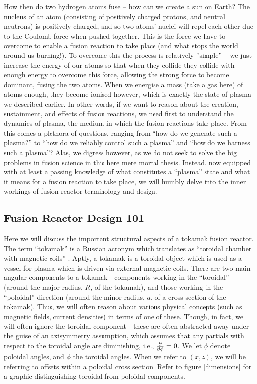 How then do two hydrogen atoms fuse -- how can we create a sun on Earth? The nucleus of an atom (consisting of positively charged 
protons, and neutral neutrons) is positively charged, and so two atoms' nuclei will repel each other due to the Coulomb force when pushed together. This is the force 
we have to overcome to enable a fusion reaction to take place (and what stops the world around us burning!). To overcome this the process is relatively ``simple'' -- 
we just increase the energy of our atoms so that when they collide they collide with enough energy to overcome this force, allowing the strong force to become
dominant, fusing the two atoms. When we energise a mass (take a gas here) of atoms enough, they become ionised however, which is 
exactly the state of plasma we described earlier. In other words, if we want to reason about the creation, sustainment, and effects of 
fusion reactions, we need first to understand the dynamics of plasma, the medium in which the fusion reactions take place. From this comes a plethora of questions, ranging from 
``how do we generate such a plasma?'' to ``how do we reliably control such a plasma'' and ``how do we harness such a plasma''? Alas, we 
digress however, as we do not seek to solve the big problems in fusion science in this here mere mortal thesis. Instead, now equipped 
with at least a passing knowledge of what constitutes a ``plasma'' state and what it means for a fusion reaction to take place, 
we will humbly delve into the inner workings of fusion reactor terminology and design.


\subsection{Fusion Reactor Design 101}

Here we will discuss the important structural aspects of a tokamak fusion reactor. The term ``tokamak'' is a 
Russian acronym which translates as ``toroidal chamber with magnetic coils'' \cite{iter-tokamak-acronym}. Aptly, a tokamak is a toroidal 
object which is used as a vessel for plasma which is driven via external magnetic coils. There are two main angular components 
to a tokamak - components working in the ``toroidal'' (around the major radius, $R$, of the tokamak), and those working in the 
``poloidal'' direction (around the minor radius, $a$, of a cross section of the tokamak). Thus, we will often reason about 
various physical concepts (such as magnetic fields, current densities) in terms of one of these. Though, in fact, we will 
often ignore the toroidal component - these are often abstracted away under the guise of an axisymmetry assumption, which assumes 
that any partials with respect to the toroidal angle are diminishing, i.e., $\pdv{\phi} = 0$. We let $\phi$ denote poloidal angles, 
and $\phi$ the toroidal angles. When we refer to $(x,z)$, we will be referring to offsets within a poloidal cross section. 
Refer to figure \ref{dimensions} for a graphic distinguishing toroidal from poloidal components.

